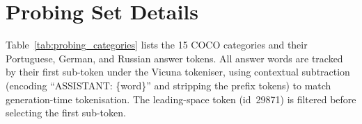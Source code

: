 \documentclass[11pt]{article}
\begin{document}


\appendix

\section{Probing Set Details}
\label{app:probing}

Table~\ref{tab:probing_categories} lists the 15 COCO categories and their
Portuguese, German, and Russian answer tokens.
All answer words are tracked by their first sub-token under the Vicuna
tokeniser, using contextual subtraction (encoding ``ASSISTANT: \{word\}'' and
stripping the prefix tokens) to match generation-time tokenisation.
The leading-space token (id~29871) is filtered before selecting the first
sub-token.
\end{document}
